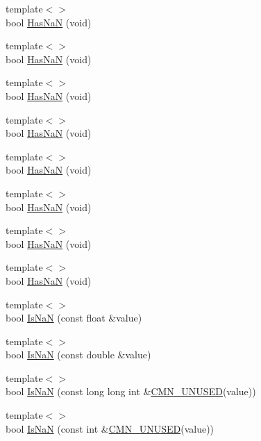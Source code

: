 \begin{DoxyCompactItemize}
\item 
{\footnotesize template$<$$>$ }\\bool \hyperlink{classcmn_type_traits_ae83a3caaf5cfdf887f909dd0d094d110}{Has\+Na\+N} (void)
\item 
{\footnotesize template$<$$>$ }\\bool \hyperlink{classcmn_type_traits_abefe58438a0ed2015063282f396326da}{Has\+Na\+N} (void)
\item 
{\footnotesize template$<$$>$ }\\bool \hyperlink{classcmn_type_traits_a8a4ef34101a2135c9b66a7a8a55dcb9c}{Has\+Na\+N} (void)
\item 
{\footnotesize template$<$$>$ }\\bool \hyperlink{classcmn_type_traits_abc78440efe19a6c8bd8e4317bcf252fe}{Has\+Na\+N} (void)
\item 
{\footnotesize template$<$$>$ }\\bool \hyperlink{classcmn_type_traits_aaa27367df3b6337fe8408ef7337cdb9f}{Has\+Na\+N} (void)
\item 
{\footnotesize template$<$$>$ }\\bool \hyperlink{classcmn_type_traits_adcb9f11f84dd4536779d118af25260fa}{Has\+Na\+N} (void)
\item 
{\footnotesize template$<$$>$ }\\bool \hyperlink{classcmn_type_traits_aef8c78022243e781d47cb400e1d733ef}{Has\+Na\+N} (void)
\item 
{\footnotesize template$<$$>$ }\\bool \hyperlink{classcmn_type_traits_ac58b943f17e99ffe4c03df784cef275c}{Has\+Na\+N} (void)
\item 
{\footnotesize template$<$$>$ }\\bool \hyperlink{classcmn_type_traits_adc22c3d557fe7ace638dbed1d40aadb6}{Is\+Na\+N} (const float \&value)
\item 
{\footnotesize template$<$$>$ }\\bool \hyperlink{classcmn_type_traits_a1ccf42512e0d991e32c996fc97eebd6f}{Is\+Na\+N} (const double \&value)
\item 
{\footnotesize template$<$$>$ }\\bool \hyperlink{classcmn_type_traits_ad2299995afa047f557362f6098235707}{Is\+Na\+N} (const long long int \&\hyperlink{cmn_portability_8h_a021894e2626935fa2305434b1e893ff6}{C\+M\+N\+\_\+\+U\+N\+U\+S\+E\+D}(value))
\item 
{\footnotesize template$<$$>$ }\\bool \hyperlink{classcmn_type_traits_af0aa311738d49efb1aa7ac89256ffaca}{Is\+Na\+N} (const int \&\hyperlink{cmn_portability_8h_a021894e2626935fa2305434b1e893ff6}{C\+M\+N\+\_\+\+U\+N\+U\+S\+E\+D}(value))

\end{DoxyCompactItemize}
